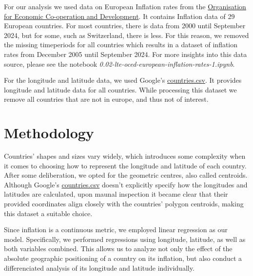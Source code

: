 \documentclass{article}
\begin{document}
    For our analysis we used data on European Inflation rates from the \href{https://data-explorer.oecd.org/vis?tm=inflation&pg=0&snb=50&vw=tb&df%5Bds%5D=dsDisseminateFinalDMZ&df%5Bid%5D=DSD_PRICES%40DF_PRICES_HICP&df%5Bag%5D=OECD.SDD.TPS&df%5Bvs%5D=1.0&dq=HRV%2BBGR%2BTUR%2BGBR%2BCHE%2BSVN%2BSWE%2BESP%2BSVK%2BPRT%2BPOL%2BNOR%2BNLD%2BLUX%2BLTU%2BLVA%2BIRL%2BITA%2BISL%2BHUN%2BGRC%2BDEU%2BFRA%2BFIN%2BEST%2BDNK%2BBEL%2BCZE%2BAUT.M.HICP.CPI.PA._T.N.GY&to%5BTIME_PERIOD%5D=false&pd=2000-01%2C2024-10}{Organisation for Economic Co-operation and Development}. It contains Inflation data of 29 European countries. For most countries, there is data from 2000 until September 2024, but for some, such as Switzerland, there is less. For this reason, we removed the missing timeperiods for all countries which results in a dataset of inflation rates from December 2005 until September 2024. For more insights into this data source, please see the notebook \emph{0.02-lte-oced-european-inflation-rates-1.ipynb}. 

    For the longitude and latitude data, we used Google's \href{https://developers.google.com/public-data/docs/canonical/countries_csv}{countries.csv}. It provides longitude and latitude data for all countries. While processing this dataset we remove all countries that are not in europe, and thus not of interest.

    \section{Methodology}

    Countries' shapes and sizes vary widely, which introduces some complexity when it comes to choosing how to represent the longitude and latitude of each country. After some deliberation, we opted for the geometric centres, also called centroids. Although Google's \href{https://developers.google.com/public-data/docs/canonical/countries_csv}{countries.csv} doesn't explicitly specify how the longitudes and latitudes are calculated, upon maunal inspection it became clear that their provided coordinates align closely with the countries' polygon centroids, making this dataset a suitable choice.
    
    Since inflation is a continuous metric, we employed linear regression as our model. Specifically, we performed regressions using longitude, latitude, as well as both variables combined. This allows us to analyze not only the effect of the absolute geographic positioning of a country on its inflation, but also conduct a differenciated analysis of its longitude and latitude individually.
\end{document}
